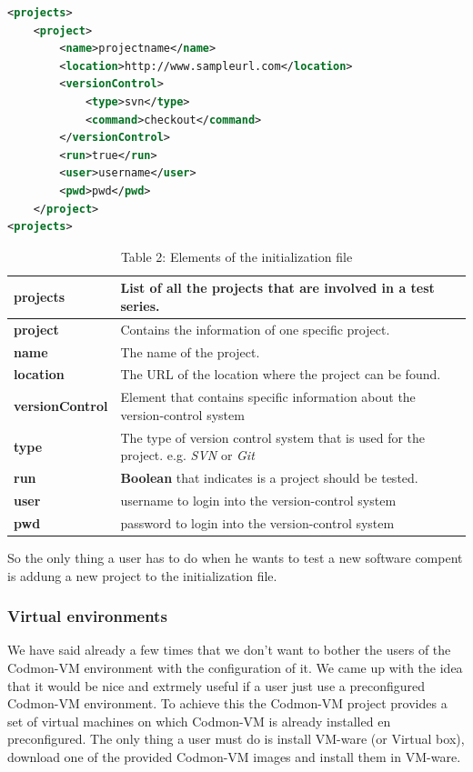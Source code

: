 \documentclass{article}
\newcommand{\project}{Codmon-VM}
\begin{document}
\begin{lstlisting}[frame=shadowbox, language=XML,showstringspaces=false]
 <projects>
	<project>
		<name>projectname</name>
		<location>http://www.sampleurl.com</location>
		<versionControl>
			<type>svn</type>
			<command>checkout</command>
		</versionControl>
		<run>true</run>
		<user>username</user>
		<pwd>pwd</pwd>
	</project>
<projects>
\end{lstlisting} 


\begin{table}
\centering
  \begin{tabular}{ | l| p{5cm} |}
  \hline
  \textbf{projects} & List of all the projects that are involved in a test series. \\ \hline
  \textbf{project} & Contains the information of one specific project. \\ \hline
  \textbf{name} & The name of the project. \\ \hline
  \textbf{location} & The URL of the location where the project can be found. \\ \hline
  \textbf{versionControl} & Element that contains specific information about the version-control system \\ \hline
  \textbf{type} & The type of version control system that is used for the project. e.g. \emph{SVN} or \emph{Git} \\ \hline
  \textbf{run} & \textbf{Boolean} that indicates is a project should be tested. \\ \hline
  \textbf{user} & username to login into the version-control system \\ \hline
  \textbf{pwd} & password to login into the version-control system \\ \hline
  \end{tabular}
\caption{Table 2: Elements of the initialization file}
\label{tab:init}
\end{table}

\noindent So the only thing a user has to do when he wants to test a new software compent is addung a new project to the initialization file.

\subsubsection{Virtual environments}
\label{imp:virual}
We have said already a few times that we don't want to bother the users of the \project{} environment with the configuration of it. We came up with the idea that it would be nice and extrmely useful if a 
user just use a preconfigured \project{} environment. To achieve this the \project{} project provides a set of virtual machines on which \project{} is already installed en preconfigured. The only thing a 
user must do is install VM-ware (or Virtual box), download one of the provided \project{} images and install them in VM-ware.\\
\end{document}
